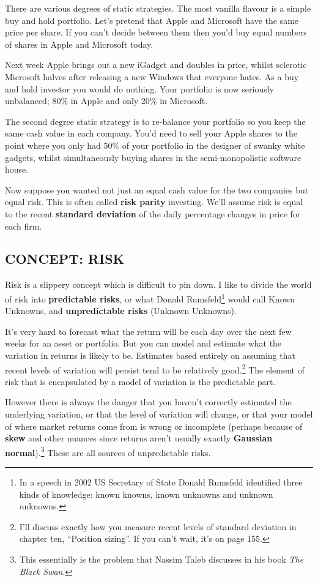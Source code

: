 There are various degrees of static strategies. The most vanilla flavour is a simple buy and hold portfolio. Let's pretend that Apple and Microsoft have the same price per share. If you can't decide between them then you'd buy equal numbers of shares in Apple and Microsoft today.

Next week Apple brings out a new iGadget and doubles in price, whilst sclerotic Microsoft halves after releasing a new Windows that everyone hates. As a buy and hold investor you would do nothing. Your portfolio is now seriously unbalanced; 80\% in Apple and only 20\% in Microsoft.

The second degree static strategy is to re-balance your portfolio so you keep the same cash value in each company. You'd need to sell your Apple shares to the point where you only had 50\% of your portfolio in the designer of swanky white gadgets, whilst simultaneously buying shares in the semi-monopolistic software house.

Now suppose you wanted not just an equal cash value for the two companies but equal risk. This is often called \textbf{risk parity} investing. We'll assume risk is equal to the recent \textbf{standard deviation} of the daily percentage changes in price for each firm.

\subsection*{CONCEPT: RISK}

Risk is a slippery concept which is difficult to pin down. I like to divide the world of risk into \textbf{predictable risks}, or what Donald Rumsfeld\footnote{In a speech in 2002 US Secretary of State Donald Rumsfeld identified three kinds of knowledge: known knowns, known unknowns and unknown unknowns.} would call Known Unknowns, and \textbf{unpredictable risks} (Unknown Unknowns).

It's very hard to forecast what the return will be each day over the next few weeks for an asset or portfolio. But you can model and estimate what the variation in returns is likely to be. Estimates based entirely on assuming that recent levels of variation will persist tend to be relatively good.\footnote{I'll discuss exactly how you measure recent levels of standard deviation in chapter ten, ``Position sizing''. If you can't wait, it's on page 155.} The element of risk that is encapsulated by a model of variation is the predictable part.

However there is always the danger that you haven't correctly estimated the underlying variation, or that the level of variation will change, or that your model of where market returns come from is wrong or incomplete (perhaps because of \textbf{skew} and other nuances since returns aren't usually exactly \textbf{Gaussian normal}).\footnote{This essentially is the problem that Nassim Taleb discusses in his book \textit{The Black Swan}.} These are all sources of unpredictable risks.

